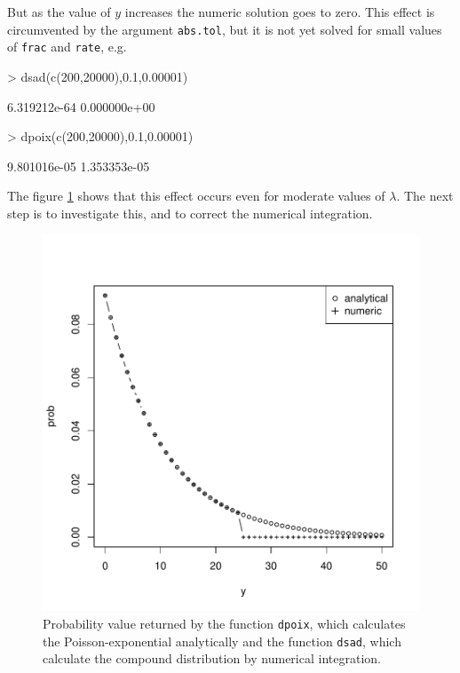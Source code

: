 \documentclass{article}
\newcommand{\code}[1]{\texttt{#1}}
\begin{document}
But as the value of $y$ increases the numeric solution goes to zero. This effect is circumvented by the argument \code{abs.tol}, but it is not yet solved for small values of \code{frac} and \code{rate}, e.g.

\begin{Schunk}
\begin{Sinput}
> dsad(c(200,20000),0.1,0.00001)
\end{Sinput}
\begin{Soutput}
[1] 6.319212e-64 0.000000e+00
\end{Soutput}
\begin{Sinput}
> dpoix(c(200,20000),0.1,0.00001)
\end{Sinput}
\begin{Soutput}
[1] 9.801016e-05 1.353353e-05
\end{Soutput}
\end{Schunk}
The figure \ref{fig:fig01} shows that this effect occurs even for moderate values of $\lambda$. The next step is to investigate this, and to correct the numerical integration.


\begin{figure}[ht]
  \begin{center}
\includegraphics{sads_tutorial-006}
\end{center}
\caption{Probability value returned by the function \code{dpoix}, which calculates the Poisson-exponential analytically and the function \code{dsad}, which calculate the compound distribution by numerical integration.}
\label{fig:fig01}
\end{figure}
\end{document}
